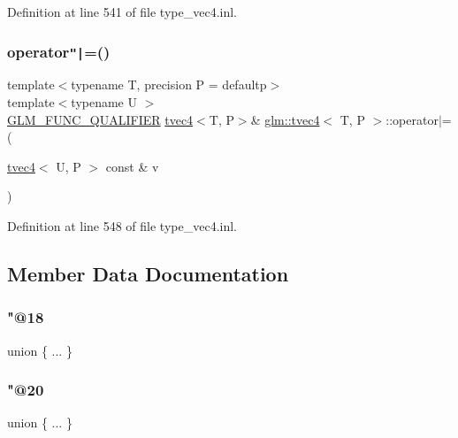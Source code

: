 Definition at line 541 of file type\+\_\+vec4.\+inl.

\mbox{\label{structglm_1_1tvec4_aabde2042533b8cf0b03d1e75de75d910}} 
\subsubsection{\texorpdfstring{operator\texttt{"|}=()}{operator|=()}\hspace{0.1cm}{\footnotesize\ttfamily [6/6]}}
{\footnotesize\ttfamily template$<$typename T, precision P = defaultp$>$ \\
template$<$typename U $>$ \\
\mbox{\hyperlink{setup_8hpp_a33fdea6f91c5f834105f7415e2a64407}{G\+L\+M\+\_\+\+F\+U\+N\+C\+\_\+\+Q\+U\+A\+L\+I\+F\+I\+ER}} \mbox{\hyperlink{structglm_1_1tvec4}{tvec4}}$<$T, P$>$\& \mbox{\hyperlink{structglm_1_1tvec4}{glm\+::tvec4}}$<$ T, P $>$\+::operator$\vert$= (\begin{DoxyParamCaption}\item[{\mbox{\hyperlink{structglm_1_1tvec4}{tvec4}}$<$ U, P $>$ const \&}]{v }\end{DoxyParamCaption})}



Definition at line 548 of file type\+\_\+vec4.\+inl.



\subsection{Member Data Documentation}
\mbox{\label{structglm_1_1tvec4_a0a2a6a34877909e8769ad5fa91bb182c}} 
\subsubsection{\texorpdfstring{"@18}{@18}}
{\footnotesize\ttfamily union \{ ... \} }

\mbox{\label{structglm_1_1tvec4_a1964e5de91c20860c7aa1b487b7247e3}} 
\subsubsection{\texorpdfstring{"@20}{@20}}
{\footnotesize\ttfamily union \{ ... \} }

